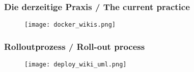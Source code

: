 \documentclass[13pt]{beamer}
\begin{document}
\begin{frame}
  \frametitle{Die derzeitige Praxis / \textcolor{mfn_green}{The current practice}}
  \begin{figure}
    \texttt{[image: docker\_wikis.png]}
  \end{figure}
\end{frame}

\begin{frame}
  \frametitle{Rolloutprozess / \textcolor{mfn_green}{Roll-out process}}

  \begin{figure}
    \texttt{[image: deploy\_wiki\_uml.png]}
  \end{figure}

\end{frame}
\end{document}

